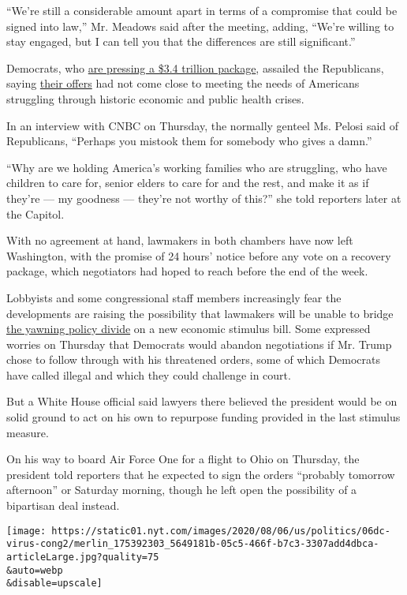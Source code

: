 ``We're still a considerable amount apart in terms of a compromise that
could be signed into law,'' Mr. Meadows said after the meeting, adding,
``We're willing to stay engaged, but I can tell you that the differences
are still significant.''

Democrats, who
\href{https://www.nytimes.com/2020/05/15/us/politics/house-simulus-vote.html}{are
pressing a \$3.4 trillion package}, assailed the Republicans, saying
\href{https://www.nytimes.com/interactive/2020/07/30/upshot/coronavirus-stimulus-bill.html}{their
offers} had not come close to meeting the needs of Americans struggling
through historic economic and public health crises.

In an interview with CNBC on Thursday, the normally genteel Ms. Pelosi
said of Republicans, ``Perhaps you mistook them for somebody who gives a
damn.''

``Why are we holding America's working families who are struggling, who
have children to care for, senior elders to care for and the rest, and
make it as if they're --- my goodness --- they're not worthy of this?''
she told reporters later at the Capitol.

With no agreement at hand, lawmakers in both chambers have now left
Washington, with the promise of 24 hours' notice before any vote on a
recovery package, which negotiators had hoped to reach before the end of
the week.

Lobbyists and some congressional staff members increasingly fear the
developments are raising the possibility that lawmakers will be unable
to bridge
\href{https://www.nytimes.com/2020/08/05/us/politics/congress-coronavirus-stimulus.html}{the
yawning policy divide} on a new economic stimulus bill. Some expressed
worries on Thursday that Democrats would abandon negotiations if Mr.
Trump chose to follow through with his threatened orders, some of which
Democrats have called illegal and which they could challenge in court.

But a White House official said lawyers there believed the president
would be on solid ground to act on his own to repurpose funding provided
in the last stimulus measure.

On his way to board Air Force One for a flight to Ohio on Thursday, the
president told reporters that he expected to sign the orders ``probably
tomorrow afternoon'' or Saturday morning, though he left open the
possibility of a bipartisan deal instead.

\texttt{[image: https://static01.nyt.com/images/2020/08/06/us/politics/06dc-virus-cong2/merlin\_175392303\_5649181b-05c5-466f-b7c3-3307add4dbca-articleLarge.jpg?quality=75\\\&auto=webp\\\&disable=upscale]}

